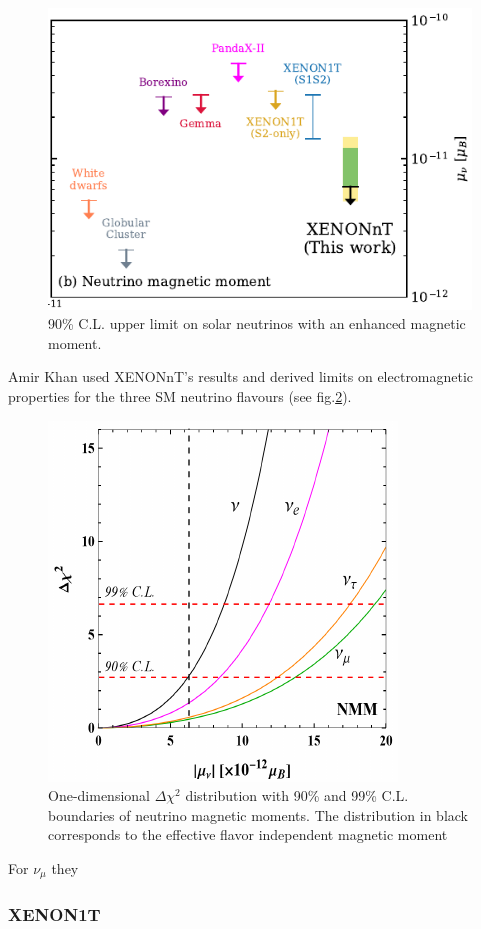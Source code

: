\begin{figure}
    \centering
    \hspace*{1.5cm}\includegraphics[width=.7\textwidth]{Plots/XENONnTExpResultsComparison.pdf}
    \caption{90\% C.L. upper limit on solar neutrinos with an enhanced magnetic moment.}
    \label{fig:XENONnTResults}
\end{figure}
Amir Khan used\cite{KhanXENONnTImplications2022.pdf} XENONnT's results and derived limits on electromagnetic properties for the three SM neutrino flavours (see fig.\ref{fig:XENONnTFit_Khan}).
\begin{figure}
    \centering
    \includegraphics[width=.65\textwidth]{Plots/XENONnTFitForNuMM_Khan.pdf}
    \caption{One-dimensional $\Delta\chi^2$ distribution with 90\% and 99\% C.L. boundaries of neutrino magnetic moments. The distribution in black corresponds to the effective flavor independent magnetic moment}
    \label{fig:XENONnTFit_Khan}
\end{figure}
For $\nu_\mu$ they 

\subsubsection{XENON1T}

